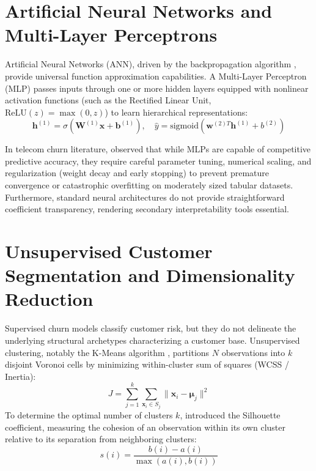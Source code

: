 \documentclass[12pt,a4paper]{report}
\begin{document}
\section{Artificial Neural Networks and Multi-Layer Perceptrons}
Artificial Neural Networks (ANN), driven by the backpropagation algorithm \citep{rumelhart1986learning}, provide universal function approximation capabilities. A Multi-Layer Perceptron (MLP) passes inputs through one or more hidden layers equipped with nonlinear activation functions (such as the Rectified Linear Unit, $\text{ReLU}(z) = \max(0, z)$) to learn hierarchical representations:
\begin{equation}
    \mathbf{h}^{(1)} = \sigma(\mathbf{W}^{(1)} \mathbf{x} + \mathbf{b}^{(1)}), \quad \hat{y} = \text{sigmoid}(\mathbf{w}^{(2)T} \mathbf{h}^{(1)} + b^{(2)})
\end{equation}

In telecom churn literature, \citet{vafeiadis2015comparison} observed that while MLPs are capable of competitive predictive accuracy, they require careful parameter tuning, numerical scaling, and regularization (weight decay and early stopping) to prevent premature convergence or catastrophic overfitting on moderately sized tabular datasets. Furthermore, standard neural architectures do not provide straightforward coefficient transparency, rendering secondary interpretability tools essential.

\section{Unsupervised Customer Segmentation and Dimensionality Reduction}
Supervised churn models classify customer risk, but they do not delineate the underlying structural archetypes characterizing a customer base. Unsupervised clustering, notably the K-Means algorithm \citep{macqueen1967some}, partitions $N$ observations into $k$ disjoint Voronoi cells by minimizing within-cluster sum of squares (WCSS / Inertia):
\begin{equation}
    J = \sum_{j=1}^k \sum_{\mathbf{x}_i \in S_j} \|\mathbf{x}_i - \boldsymbol{\mu}_j\|^2
\end{equation}
To determine the optimal number of clusters $k$, \citet{rousseeuw1987silhouettes} introduced the Silhouette coefficient, measuring the cohesion of an observation within its own cluster relative to its separation from neighboring clusters:
\begin{equation}
    s(i) = \frac{b(i) - a(i)}{\max(a(i), b(i))}
\end{equation}
\end{document}
